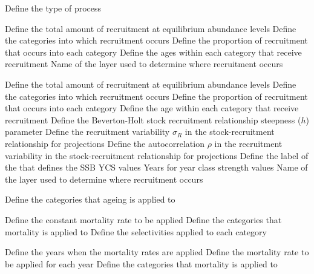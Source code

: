  {Define the type of process}
\par\textbf{}\par
{} {Define the total amount of recruitment at equilibrium abundance levels}
 {Define the categories into which recruitment occurs}
 {Define the proportion of recruitment that occurs into each category}
 {Define the ages within each category that receive recruitment}
 {Name of the layer used to determine where recruitment occurs}
\par\textbf{}\par
{} {Define the total amount of recruitment at equilibrium abundance levels}
 {Define the categories into which recruitment occurs}
 {Define the proportion of recruitment that occurs into each category}
 {Define the age within each category that receive recruitment}
 {Define the Beverton-Holt stock recruitment relationship steepness ($h$) parameter}
 {Define the recruitment variability $\sigma_R$ in the stock-recruitment relationship for projections}
 {Define the autocorrelation $\rho$ in the recruitment variability in the stock-recruitment relationship for projections}
 {Define the label of the  that defines the SSB}
 {YCS values}
 {Years for year class strength values}
 {Name of the layer used to determine where recruitment occurs}
\par\textbf{}\par
{} {Define the categories that ageing is applied to}
\par\textbf{}\par
{} {Define the constant mortality rate to be applied}
 {Define the categories that mortality is applied to}
 {Define the selectivities applied to each category}
\par\textbf{}\par
{} {Define the years when the mortality rates are applied}
 {Define the mortality rate to be applied for each year}
 {Define the categories that mortality is applied to}
